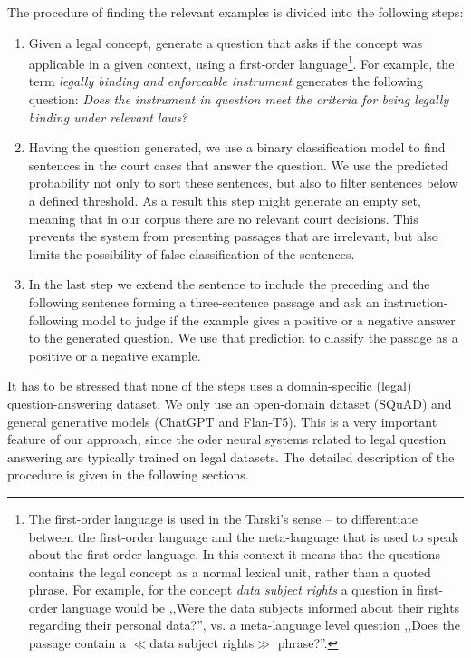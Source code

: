 \documentclass{IOS-Book-Article}
\begin{document}
The procedure of finding the relevant examples is divided into the following steps:
\begin{enumerate}
  \item Given a legal concept, generate a question that asks if the concept was applicable in a given context,
    using a first-order language\footnote{The first-order language is used in the Tarski's sense -- to differentiate
    between the first-order language and the meta-language that is used to speak about the first-order language. In this 
    context it means that the questions contains the legal concept as a normal lexical unit, rather than a quoted phrase.
    For example, for the concept \textit{data subject rights} a question in first-order language would be 
      ,,Were the data subjects informed about their rights regarding their personal data?'', vs. 
      a meta-language level question ,,Does the passage contain a $\ll$data subject rights$\gg$ phrase?''.}.
    For example, the term \textit{legally binding and enforceable instrument} generates the following question:
    \textit{Does the instrument in question meet the criteria for being legally binding under relevant laws?}
  \item Having the question generated, we use a binary classification model to find sentences in the court cases that answer the question. 
    We use the predicted probability not only to sort these sentences, but also to filter sentences below a defined threshold.
    As a result this step might generate an empty set, meaning that in our corpus there are no relevant court decisions. 
    This prevents the system from presenting passages that are irrelevant, but also limits the possibility of false
    classification of the sentences.
  \item In the last step we extend the sentence to include the preceding and the following sentence forming a three-sentence passage
    and ask an instruction-following model to judge if the example gives a positive or a negative answer to the generated question.
    We use that prediction to classify the passage as a positive or a negative example.
\end{enumerate}

It has to be stressed that none of the steps uses a domain-specific (legal) question-answering dataset. We only use an open-domain
dataset (SQuAD) and general generative models (ChatGPT and Flan-T5). This is a very important feature of our approach,
since the oder neural systems related to legal question answering are typically trained on legal datasets.
The detailed description of the procedure is given in the following sections.
\end{document}

